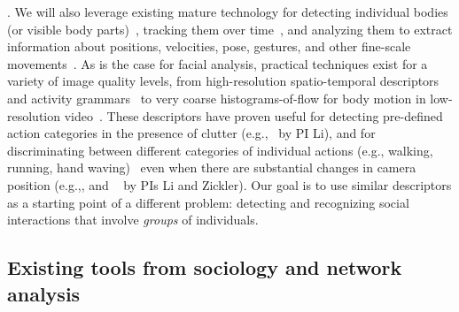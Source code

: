 

. We will also leverage existing mature technology for detecting individual bodies (or visible body parts)~\cite{Dalal:HOG,poselet,pose_part}, tracking them over time~\cite{RamananFZ07,EshelM10}, and analyzing them to extract information about positions, velocities, pose, gestures, and other fine-scale movements~\cite{Mitra:gesture,Ryoo:action,Poppe}. As is the case for facial analysis, practical techniques exist for a variety of image quality levels, from high-resolution spatio-temporal descriptors~\cite{Dollar:STIP,Laptev:STIP,Brox:flow} and activity grammars~\cite{Niebles2007,Niebles2006} to very coarse histograms-of-flow for body motion in low-resolution video~\cite{EfrosBMM03}. These descriptors have proven useful for detecting pre-defined action categories in the presence of clutter (e.g.,~\cite{Li2010} by PI Li), and for discriminating between different categories of individual actions (e.g., walking, running, hand waving)~\cite{Weizmann,KTH} even when there are substantial changes in camera position (e.g.,\cite{Weinland:invariance2}, and ~\cite{LiZickler2012} by PIs Li and Zickler). Our goal is to use similar descriptors as a starting point of a different problem: detecting and recognizing social interactions that involve \emph{groups} of individuals. 




\subsection{Existing tools from sociology and network analysis}

